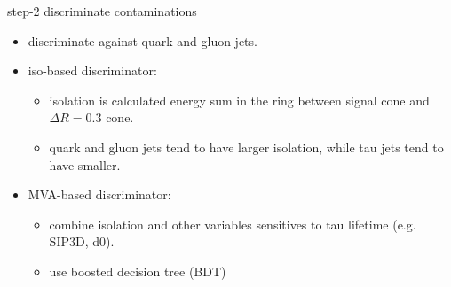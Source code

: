\begin{frame}{}
\smaller
    
    \begin{columns}[c]
        \begin{block}{step-2 discriminate contaminations}
        \begin{itemize} 
            \item discriminate against quark and gluon jets.
            \item iso-based discriminator: 
            \begin{itemize} 
            \smaller
                \item isolation is calculated energy sum in the ring between signal cone and $\Delta R = 0.3$ cone.
                \item quark and gluon jets tend to have larger isolation, while tau jets tend to have smaller.
            \end{itemize}
        
             
            
            \item MVA-based discriminator: 
            \begin{itemize} 
            \smaller
                \item combine isolation and other variables sensitives to tau lifetime (e.g. SIP3D, d0).
                \item use boosted decision tree (BDT)
            \end{itemize}
            
            
        \end{itemize}
        \end{block}


\end{columns}
\end{frame}
